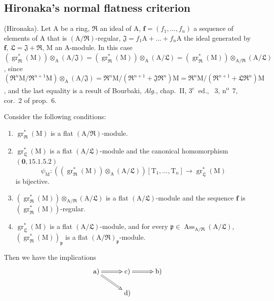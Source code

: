 \subsection{Hironaka's normal flatness criterion}
\label{subsection:IV.19.7}
\label{IV.19.7}

\begin{theorem}[19.7.1]
\label{IV.19.7.1}
\textup{(Hironaka).}
Let $\mathrm{A}$ be a ring, $\mathfrak{R}$ an ideal of $\mathrm{A}$, $\mathbf{f}=(f_1,\ldots,f_n)$ a sequence of elements of $\mathrm{A}$ that is $(\mathrm{A}/\mathfrak{R})$-regular, $\mathfrak{J}=f_1\mathrm{A}+\ldots+f_n\mathrm{A}$ the ideal generated by $\mathbf{f}$, $\mathfrak{L}=\mathfrak{J}+\mathfrak{R}$, $\mathrm{M}$ an $\mathrm{A}$-module.
In this case $(\operatorname{gr}_\mathfrak{R}^*(\mathrm{M}))\otimes_\mathrm{A}(\mathrm{A}/\mathfrak{J})=(\operatorname{gr}_\mathfrak{R}^*(\mathrm{M}))\otimes_\mathrm{A}(\mathrm{A}/\mathfrak{L})=(\operatorname{gr}_\mathfrak{R}^*(\mathrm{M}))\otimes_{\mathrm{A}/\mathfrak{R}}(\mathrm{A}/\mathfrak{L})$, since $(\mathfrak{R}^n\mathrm{M}/\mathfrak{R}^{n+1}\mathrm{M})\otimes_\mathrm{A}(\mathrm{A}/\mathfrak{J})=\mathfrak{R}^n\mathrm{M}/(\mathfrak{R}^{n+1}+\mathfrak{J}\mathfrak{R}^n)\mathrm{M}=\mathfrak{R}^n\mathrm{M}/(\mathfrak{R}^{n+1}+\mathfrak{L}\mathfrak{R}^n)\mathrm{M}$, and the last equality is a result of Bourbaki, \emph{Alg.}, chap.~II, $3^e$~ed., \textsection~3, n\textsuperscript{o}~7, cor.~2 of prop.~6.

Consider the following conditions:
\begin{enumerate}
\item[\rm a)] $\operatorname{gr}_\mathfrak{R}^*(\mathrm{M})$ is a flat $(\mathrm{A}/\mathfrak{R})$-module.
\item[\rm b)] $\operatorname{gr}_\mathfrak{L}^*(\mathrm{M})$ is a flat $(\mathrm{A}/\mathfrak{L})$-module and the canonical homomorphism $(\mathbf{0},15.1.5.2)$
\[
  \psi_\mathrm{M}:((\operatorname{gr}_\mathfrak{R}^*(\mathrm{M}))\otimes_\mathrm{A}(\mathrm{A}/\mathfrak{L}))[\mathrm{T}_1,\ldots,\mathrm{T}_n]\to\operatorname{gr}_\mathfrak{L}^*(\mathrm{M})
\]
is bijective.
\item[\rm c)] $(\operatorname{gr}_\mathfrak{R}^*(\mathrm{M}))\otimes_{\mathrm{A}/\mathfrak{R}}(\mathrm{A}/\mathfrak{L})$ is a flat $(\mathrm{A}/\mathfrak{L})$-module and the sequence $\mathbf{f}$ is $(\operatorname{gr}_\mathfrak{R}^*(\mathrm{M}))$-regular.
\item[\rm d)] $\operatorname{gr}_\mathfrak{L}^*(\mathrm{M})$ is a flat $(\mathrm{A}/\mathfrak{L})$-module, and for every $\mathfrak{p}\in\operatorname{Ass}_{\mathrm{A}/\mathfrak{R}}(\mathrm{A}/\mathfrak{L})$, $(\operatorname{gr}_\mathfrak{R}^*(\mathrm{M}))_\mathfrak{p}$ is a flat $(\mathrm{A}/\mathfrak{R})_\mathfrak{p}$-module.
\end{enumerate}
Then we have the implications
\[
\xymatrix@C=3em@R=1.6em{
  \text{a)} \ar@{=>}[r] \ar@{=>}[dr] & \text{c)} \ar@{=>}[r] & \text{b)} \\
  & \text{d)}
}
\]


\end{theorem}
